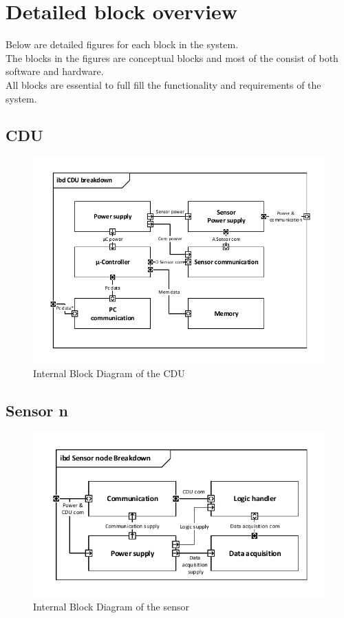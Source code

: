 \section{Detailed block overview}
Below are detailed figures for each block in the system.\\
The blocks in the figures are conceptual blocks and most of the consist of both software and hardware.\\
All blocks are essential to full fill the functionality and requirements of the system.

\subsection{CDU}

\begin{figure}[hbpt]
\centering
\includegraphics[width=.9\textwidth]{billeder/CDU_IBD}
\caption{Internal Block Diagram of the CDU}
\label{CDU_IBD}
\end{figure}

\subsection{Sensor n}

\begin{figure}[hbpt]
\centering
\includegraphics[width=.9\textwidth]{billeder/Sensor_IBD}
\caption{Internal Block Diagram of the sensor}
\label{Sensor_IBD}
\end{figure}


